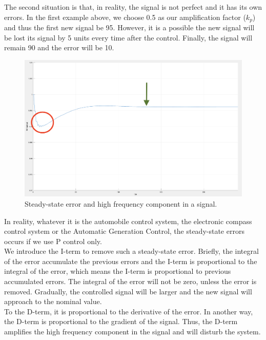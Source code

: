 \documentclass{report}
\begin{document}
The second situation is that, in reality, the signal is not perfect and it has its own errors. In the first example above, we choose 0.5 as our amplification factor ($k_p$) and thus the first new signal be 95. However, it is a possible the new signal will be lost its signal by 5 units every time after the control. Finally, the signal will remain 90 and the error will be 10. \\

\begin{figure}[htbp]
\centering
\includegraphics[width = .891\textwidth]{figure/3_2_steady.png}
\caption{Steady-state error and high frequency component in a signal.}
\label{3_2_steady}
\end{figure}

In reality, whatever it is the automobile control system, the electronic compass control system or the Automatic Generation Control, the steady-state errors occurs if we use P control only.\\

We introduce the I-term to remove such a steady-state error. Briefly, the integral of the error accumulate the previous errors and the I-term is proportional to the integral of the error, which means the I-term is proportional to previous accumulated errors. The integral of the error will not be zero, unless the error is removed. Gradually, the controlled signal will be larger and the new signal will approach to the nominal value.\\

To the D-term, it is proportional to the derivative of the error. In another way, the D-term is proportional to the gradient of the signal. Thus, the D-term amplifies the high frequency component in the signal and will disturb the system.\\
\end{document}
